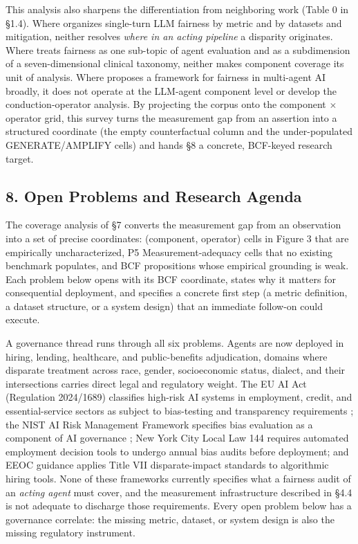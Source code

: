 \documentclass[10pt]{article}
\begin{document}
This analysis also sharpens the differentiation from neighboring work (Table 0 in \S{}1.4). Where \cite{chu2024fairness} organizes single-turn LLM fairness by metric and \cite{gallegos2024bias} by datasets and mitigation, neither resolves \emph{where in an acting pipeline} a disparity originates. Where \cite{mohammadi2025evaluation} treats fairness as one sub-topic of agent evaluation and \cite{vatsal2026agentic} as a subdimension of a seven-dimensional clinical taxonomy, neither makes component coverage its unit of analysis. Where \cite{ranjan2025fairness} proposes a framework for fairness in multi-agent AI broadly, it does not operate at the LLM-agent component level or develop the conduction-operator analysis. By projecting the corpus onto the component $\times$ operator grid, this survey turns the measurement gap from an assertion into a structured coordinate (the empty counterfactual column and the under-populated GENERATE/AMPLIFY cells) and hands \S{}8 a concrete, BCF-keyed research target.


\subsection*{8. Open Problems and Research Agenda}

The coverage analysis of \S{}7 converts the measurement gap from an observation into a set of precise coordinates: (component, operator) cells in Figure 3 that are empirically uncharacterized, P5 Measurement-adequacy cells that no existing benchmark populates, and BCF propositions whose empirical grounding is weak. Each problem below opens with its BCF coordinate, states why it matters for consequential deployment, and specifies a concrete first step (a metric definition, a dataset structure, or a system design) that an immediate follow-on could execute.

A governance thread runs through all six problems. Agents are now deployed in hiring, lending, healthcare, and public-benefits adjudication, domains where disparate treatment across race, gender, socioeconomic status, dialect, and their intersections carries direct legal and regulatory weight. The EU AI Act (Regulation 2024/1689) classifies high-risk AI systems in employment, credit, and essential-service sectors as subject to bias-testing and transparency requirements \cite{parliament2024regulation}; the NIST AI Risk Management Framework specifies bias evaluation as a component of AI governance \cite{nist2023artificial}; New York City Local Law 144 requires automated employment decision tools to undergo annual bias audits before deployment; and EEOC guidance applies Title VII disparate-impact standards to algorithmic hiring tools. None of these frameworks currently specifies what a fairness audit of an \emph{acting agent} must cover, and the measurement infrastructure described in \S{}4.4 is not adequate to discharge those requirements. Every open problem below has a governance correlate: the missing metric, dataset, or system design is also the missing regulatory instrument.
\end{document}
